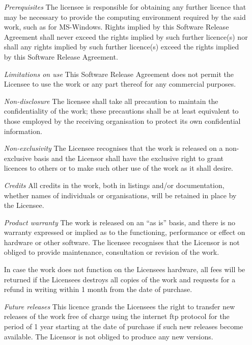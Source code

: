 \begin{enumerate}
    \item[\it Prerequisites]
The licensee is responsible for obtaining any further licence that may
be necessary to provide the computing environment required by the said
work, such as for MS-Windows.  Rights implied by this Software Release
Agreement shall never exceed the rights implied by such further
licence(s) nor shall any rights implied by such further licence(s)
exceed the rights implied by this Software Release Agreement.
    \item[\it Limitations on use]
This Software Release Agreement does not permit the Licensee to use the
work or any part thereof for any commercial purposes.
    \item[\it Non-disclosure]
The licensee shall take all precaution to maintain the confidentiality
of the work; these precautions shall be at least equivalent to those
employed by the receiving organisation to protect its own confidential
information. 
    \item[\it Non-exclusivity]
The Licensee recognises that the work is released on a non-exclusive
basis and the Licensor shall have the exclusive right to grant licences
to others or to make such other use of the work as it shall desire.
    \item[\it Credits]
All credits in the work, both in listings and/or documentation, whether
names of individuals or organisations, will be retained in place by the
Licensee.
    \item[\it Product warranty]
The work is released on an ``as is'' basis, and there is no warranty
expressed or implied as to the functioning, performance or effect on
hardware or other software. The licensee recognises that the Licensor
is not obliged to provide maintenance, consultation or revision of the
work.

In case the work does not function on the Licensees hardware, all fees
will be returned if the Licensees destroys all copies of the work and
requests for a refund in writing within 1 month from the date of
purchase.
    \item[\it Future releases]
This licence grands the Licensees the right to transfer new releases of
the work free of charge using the internet ftp protocol for the period
of 1 year starting at the date of purchase if such new releases become
available.  The Licensor is not obliged to produce any new versions.
\end{enumerate}


